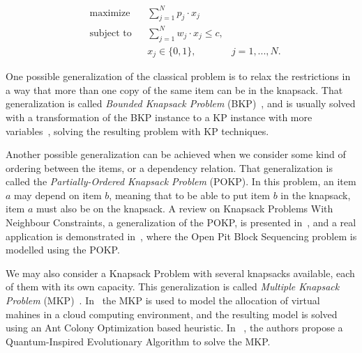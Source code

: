 \begin{equation}
\label{eq:knap01}
  \begin{aligned}
    & \text{maximize}
    & & \sum_{j=1}^{N} p_j \cdot x_j \\
    & \text{subject to} 
    & & \sum_{j=1}^{N} w_j \cdot x_j \leq c, \\
    & & & x_j \in \{0,1\}, &j = 1,...,N.
  \end{aligned}
\end{equation}

One possible generalization of the classical problem is to relax the restrictions in a way that more than one 
copy of the same item can be in the knapsack. That generalization is called \textit{Bounded Knapsack Problem} (BKP)~\cite{pisinger1995}, 
and is usually solved with a transformation of the BKP instance to a KP instance with more variables~\cite{kellerer2004knapsack}, 
solving the resulting problem with KP techniques.

Another possible generalization can be achieved when we consider some kind of ordering between the items, or a dependency relation. 
That generalization is called the \textit{Partially-Ordered Knapsack Problem} (POKP)\cite{pok2002}. In this problem, an item $a$ may depend on item $b$, meaning
that to be able to put item $b$ in the knapsack, item $a$ must also be on the knapsack. A review on Knapsack Problems With Neighbour Constraints, a generalization of the POKP, is presented
in~\cite{borradaile2012}, and a real application is demonstrated in~\cite{lambert2014}, where the Open Pit Block Sequencing problem is modelled using the POKP.

We may also consider a Knapsack Problem with several knapsacks available, each of them with its own capacity. This generalization is called 
\textit{Multiple Knapsack Problem} (MKP)~\cite{kellerer2004knapsack}. In~\cite{amarante2013} the MKP is used to model the allocation of virtual mahines in a 
cloud computing environment, and the resulting model is solved using an Ant Colony Optimization based heuristic. 
In ~\cite{patvardhan2014}, the authors propose a Quantum-Inspired Evolutionary Algorithm to solve the MKP.

